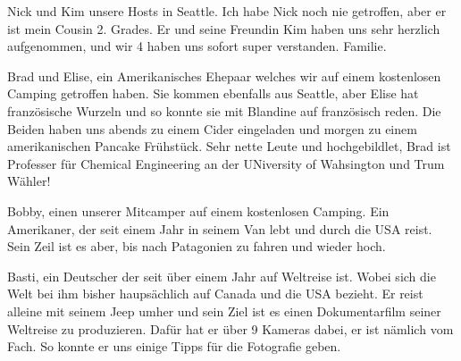 \documentclass[11pt]{book}
\begin{document}
Nick und Kim unsere Hosts in Seattle. Ich habe Nick noch nie getroffen, aber er ist mein Cousin 2. Grades. Er und seine Freundin Kim haben uns sehr herzlich aufgenommen, 
und wir 4 haben uns sofort super verstanden. Familie. 


Brad und Elise, ein Amerikanisches Ehepaar welches wir auf einem kostenlosen Camping getroffen haben. Sie kommen ebenfalls aus Seattle, aber Elise hat 
französische Wurzeln und so konnte sie mit Blandine auf französisch reden. Die Beiden haben uns abends zu einem Cider eingeladen und morgen zu einem amerikanischen 
Pancake Frühstück. Sehr nette Leute und hochgebildlet, Brad ist Professer für Chemical Engineering an der UNiversity of Wahsington und Trum Wähler!


Bobby, einen unserer Mitcamper auf einem kostenlosen Camping. Ein Amerikaner, der seit einem Jahr in seinem Van lebt und durch die USA reist. Sein Zeil 
ist es aber, bis nach Patagonien zu fahren und wieder hoch.


Basti, ein Deutscher der seit über einem Jahr auf Weltreise ist. Wobei sich die Welt bei ihm bisher  haupsächlich auf Canada und die USA bezieht. Er reist alleine 
mit seinem Jeep umher und sein Ziel ist es einen Dokumentarfilm seiner Weltreise zu produzieren. Dafür hat er über 9 Kameras dabei, er ist nämlich vom Fach. 
So konnte er uns einige Tipps für die Fotografie geben. 
\end{document}
